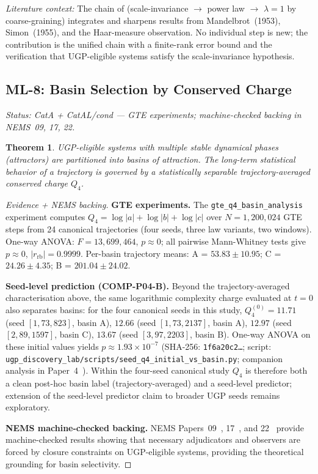 \documentclass[11pt]{article}
\newtheorem{theorem}{Theorem}[section]
\begin{document}
\textit{Literature context:} The chain of (scale-invariance $\to$ power law $\to$ $\lambda=1$ by coarse-graining) integrates and sharpens results from Mandelbrot~(1953), Simon~(1955), and the Haar-measure observation. No individual step is new; the contribution is the unified chain with a finite-rank error bound and the verification that UGP-eligible systems satisfy the scale-invariance hypothesis.

\subsection{ML-8: Basin Selection by Conserved Charge}
\emph{Status: CatA + CatAL/cond — GTE experiments; machine-checked backing in NEMS~09, 17, 22.}

\begin{theorem}
UGP-eligible systems with multiple stable dynamical phases (attractors) are partitioned into basins of attraction. The long-term statistical behavior of a trajectory is governed by a statistically separable trajectory-averaged conserved charge $Q_4$.
\end{theorem}
\begin{proof}[Evidence + NEMS backing]
\textbf{GTE experiments.} The \texttt{gte\_q4\_basin\_analysis} experiment computes $Q_4 = \log|a| + \log|b| + \log|c|$ over $N = 1{,}200{,}024$ GTE steps from 24 canonical trajectories (four seeds, three law variants, two windows). One-way ANOVA: $F = 13{,}699{,}464$, $p \approx 0$; all pairwise Mann-Whitney tests give $p \approx 0$, $|r_{\text{rb}}| = 0.9999$. Per-basin trajectory means: A = $53.83 \pm 10.95$; C = $24.26 \pm 4.35$; B = $201.04 \pm 24.02$.

\textbf{Seed-level prediction (COMP-P04-B).} Beyond the trajectory-averaged
characterisation above, the same logarithmic complexity charge evaluated at
$t = 0$ also separates basins: for the four canonical seeds in this study,
$Q_4^{(0)} = 11.71$ (seed $[1,73,823]$, basin A), $12.66$ (seed $[1,73,2137]$,
basin A), $12.97$ (seed $[2,89,1597]$, basin C), $13.67$ (seed $[3,97,2203]$,
basin B). One-way ANOVA on these initial values yields $p \approx 1.93\times10^{-7}$
(SHA-256: \texttt{1f6a20c2\dots}; script:
\texttt{ugp\_discovery\_lab/\allowbreak scripts/\allowbreak seed\_q4\_initial\_vs\_basin.py};
companion analysis in Paper~4~\cite{Spivack2025_UGPDynamicsUniversality}).
Within the four-seed canonical study $Q_4$ is therefore both a clean post-hoc
basin label (trajectory-averaged) and a seed-level predictor; extension of the
seed-level predictor claim to broader UGP seeds remains exploratory.

\textbf{NEMS machine-checked backing.} NEMS Papers~09~\cite{SpivackNEMS09}, 17~\cite{SpivackNEMS17}, and 22~\cite{SpivackNEMS22} provide machine-checked results showing that necessary adjudicators and observers are forced by closure constraints on UGP-eligible systems, providing the theoretical grounding for basin selectivity.
\end{proof}
\end{document}

